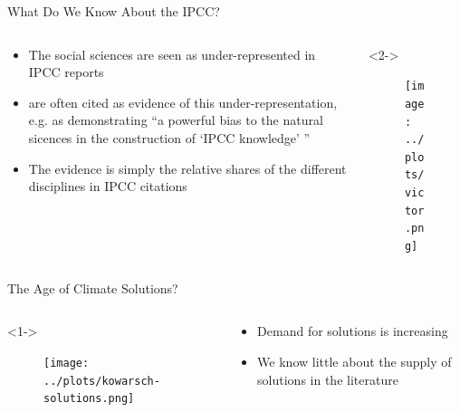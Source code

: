 \documentclass[9pt, aspectratio=169]{beamer}
\begin{document}

\begin{frame}{What Do We Know About the IPCC?}
\begin{columns}
	\begin{column}{0.618\linewidth}
		\begin{itemize}
			\item<2-> The social sciences are seen as under-represented in IPCC reports
			\item<3-> \citep{Bjurstroem2011} are often cited as evidence of this under-representation, e.g. as demonstrating ``a powerful bias to the natural sicences in the construction of `IPCC knowledge' '' \cite{Hulme2010}
			\item<4-> The evidence is simply the relative shares of the different disciplines in IPCC citations
			
		\end{itemize}
	\end{column}
	\begin{column}{0.382\linewidth}<2->
		\begin{figure}[h!]
			\begin{center}
				\texttt{[image: ../plots/victor.png]}
				\caption{\citep{Victor2015}}
			\end{center}
		\end{figure}
	\end{column}
\end{columns}
\end{frame}

\begin{frame}{The Age of Climate Solutions? }
\begin{columns}
	
	\begin{column}{0.618\linewidth}<1->
		\begin{figure}[h!]
			\begin{center}
				\texttt{[image: ../plots/kowarsch-solutions.png]}
				\caption{\citep{Kowarsch2017}}
			\end{center}
		\end{figure}
		
	\end{column}
	\begin{column}{0.382\linewidth}
		\begin{itemize}
			\item<1-> Demand for solutions is increasing
			\item<2-> We know little about the supply of solutions in the literature
			
			
		\end{itemize}
	\end{column}
\end{columns}
\end{frame}
\end{document}

